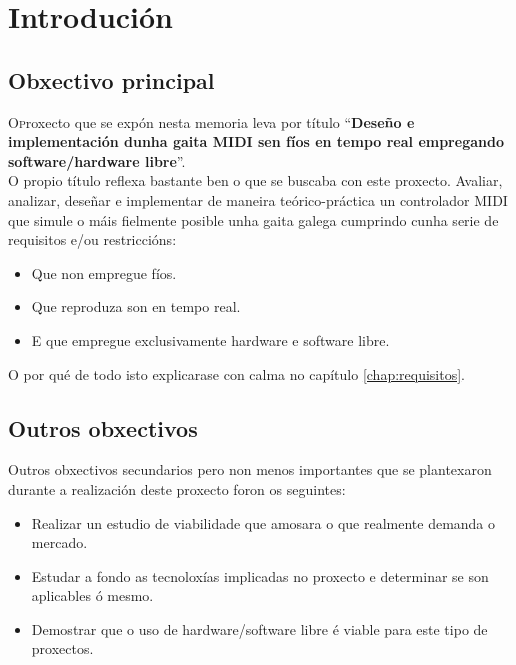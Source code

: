 \chapter{Introdución}
\minitoc
\label{chap:introduccion}


\section{Obxectivo principal}

 \lettrine{O} proxecto que se expón nesta memoria leva por título
 ``\textbf{Deseño e implementación dunha gaita MIDI sen fíos en tempo real
 empregando software/hardware libre}''. \\

 O propio título reflexa bastante ben o que se buscaba con este proxecto.
 Avaliar, analizar, deseñar e implementar de maneira teórico-práctica un 
 controlador MIDI que simule o máis fielmente posible unha gaita galega
 cumprindo cunha serie de requisitos e/ou restriccións:

 \begin{itemize}
  \item Que non empregue fíos.
  \item Que reproduza son en tempo real.
  \item E que empregue exclusivamente hardware e software libre.
 \end{itemize}

 O por qué de todo isto explicarase con calma no capítulo
 \ref{chap:requisitos}.

\section{Outros obxectivos}

 Outros obxectivos secundarios pero non menos importantes que se plantexaron
 durante a realización deste proxecto foron os seguintes:
 
 \begin{itemize}
  \item Realizar un estudio de viabilidade que amosara o que realmente demanda
        o mercado.
  \item Estudar a fondo as tecnoloxías implicadas no proxecto e determinar se
        son aplicables ó mesmo.
  \item Demostrar que o uso de hardware/software libre é viable para este tipo
        de proxectos.
 \end{itemize}

